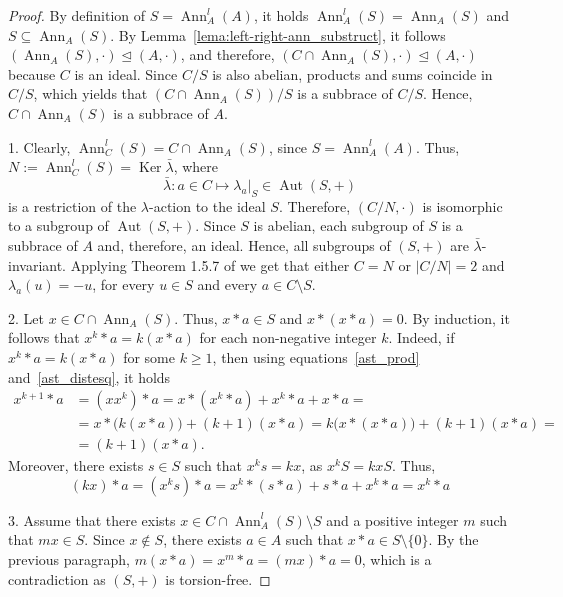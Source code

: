 \documentclass[12pt, a4paper, english]{article}
\theoremstyle{definition}
\DeclareMathOperator{\Aut}{Aut}
\DeclareMathOperator{\Ann}{Ann}
\DeclareMathOperator{\Ker}{Ker}
\begin{document}
\begin{proof}
By definition of $S = \Ann_A^l(A)$, it holds $\Ann_A^l(S) = \Ann_A(S)$ and $S \subseteq \Ann_A(S)$. By Lemma~\ref{lema:left-right-ann_substruct},  it follows $(\Ann_A(S), \cdot) \unlhd (A,\cdot)$, and therefore, $(C\cap \Ann_A(S), \cdot) \unlhd (A,\cdot)$ because $C$ is an ideal. Since $C/S$ is also abelian,  products and sums coincide in $C/S$, which yields that  $(C\cap \Ann_A(S))/S$ is a subbrace of $C/S$. Hence,  $C\cap \Ann_A(S)$ is a subbrace of $A$.

1. Clearly, $\Ann_C^l(S) = C \cap \Ann_A(S)$, since $S = \Ann_A^l(A)$. Thus, $N:= \Ann_C^l(S) = \Ker\bar{\lambda}$, where 
\[ \bar{\lambda}\colon a \in C \mapsto \left.\lambda_a\right|_S \in \Aut(S,+)\]
is a restriction of the $\lambda$-action to the ideal $S$. Therefore, $(C/N,\cdot)$ is isomorphic to a subgroup of $\Aut(S,+)$. Since $S$ is abelian, each subgroup of $S$ is a subbrace of $A$ and, therefore, an ideal. Hence, all subgroups of $(S,+)$ are $\bar{\lambda}$-invariant. Applying Theorem 1.5.7 of \cite{Schmidt94} we get that either $C= N$ or  $|C/N| = 2$ and $\lambda_a(u) = -u$, for every  $u\in S$ and every $a\in C\setminus S$. 

2. Let $x\in C\cap \Ann_A(S)$. Thus, $x \ast a \in S$ and $x \ast (x \ast a) = 0$. By induction, it follows that $x^k\ast a = k(x\ast a)$ for each non-negative integer $k$. Indeed, if $x^k \ast a = k(x \ast a)$ for some $k \geq 1$, then using equations~\eqref{ast_prod} and~\eqref{ast_distesq}, it holds
\begin{align*}
x^{k+1} \ast a & = (xx^k)\ast a = x\ast (x^k\ast a) + x^k \ast a + x \ast a = \\
& = x \ast \big(k(x \ast a)\big) + (k+1)(x \ast a) = k\big(x \ast (x \ast a)\big) + (k+1)(x\ast a) =\\
& = (k+1)(x\ast a).
\end{align*}
Moreover, there exists $s \in S$ such that $x^ks = kx$, as $x^kS = kxS$. Thus,
\[ (kx) \ast a = (x^ks) \ast a = x^k \ast (s \ast a) + s \ast a + x^k \ast a = x^k \ast a \]

3. Assume that there exists  $x\in C \cap \Ann_A^l(S) \setminus S$ and a positive integer $m$ such that $mx \in S$. Since $x\notin S$, there exists $a\in A$ such that $x \ast a \in S \setminus\{0\}$. By the previous paragraph, $m(x \ast a) = x^m \ast a = (mx) \ast a = 0$, which is a contradiction as $(S,+)$ is torsion-free.
\end{proof}
\end{document}
